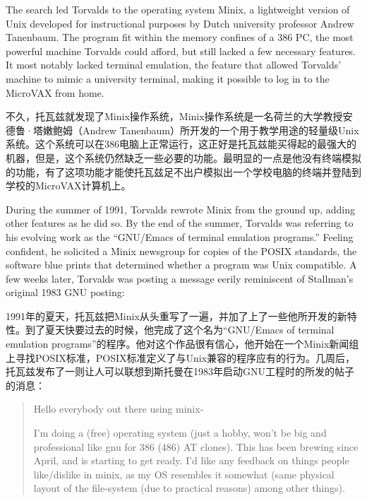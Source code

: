 \ifdefined\eng
The search led Torvalds to the operating system Minix, a lightweight version of Unix developed for instructional purposes by Dutch university professor Andrew Tanenbaum. The program fit within the memory confines of a 386 PC, the most powerful machine Torvalds could afford, but still lacked a few necessary features. It most notably lacked terminal emulation, the feature that allowed Torvalds' machine to mimic a university terminal, making it possible to log in to the MicroVAX from home.
\fi

\ifdefined\chs
不久，托瓦兹就发现了Minix操作系统，Minix操作系统是一名荷兰的大学教授安德鲁·塔嫩鲍姆（Andrew Tanenbaum）所开发的一个用于教学用途的轻量级Unix系统。这个系统可以在386电脑上正常运行，这正好是托瓦兹能买得起的最强大的机器，但是，这个系统仍然缺乏一些必要的功能。最明显的一点是他没有终端模拟的功能，有了这项功能才能使托瓦兹足不出户模拟出一个学校电脑的终端并登陆到学校的MicroVAX计算机上。
\fi

\ifdefined\eng
During the summer of 1991, Torvalds rewrote Minix from the ground up, adding other features as he did so. By the end of the summer, Torvalds was referring to his evolving work as the ``GNU/Emacs of terminal emulation programs.'' Feeling confident, he solicited a Minix newsgroup for copies of the POSIX standards, the software blue prints that determined whether a program was Unix compatible. A few weeks later, Torvalds was posting a message eerily reminiscent of Stallman's original 1983 GNU posting:
\fi

\ifdefined\chs
1991年的夏天，托瓦兹把Minix从头重写了一遍，并加了上了一些他所开发的新特性。到了夏天快要过去的时候，他完成了这个名为``GNU/Emacs of terminal emulation programs''的程序。他对这个作品很有信心，他开始在一个Minix新闻组上寻找POSIX标准，POSIX标准定义了与Unix兼容的程序应有的行为。几周后，托瓦兹发布了一则让人可以联想到斯托曼在1983年启动GNU工程时的所发的帖子的消息：
\fi

\ifdefined\eng
\begin{quote}
Hello everybody out there using minix-

I'm doing a (free) operating system (just a hobby, won't be big and professional like gnu for 386 (486) AT clones). This has been brewing since April, and is starting to get ready. I'd like any feedback on things people like/dislike in minix, as my OS resembles it somewhat (same physical layout of the file-system (due to practical reasons) among other things). 
\end{quote}
\fi

